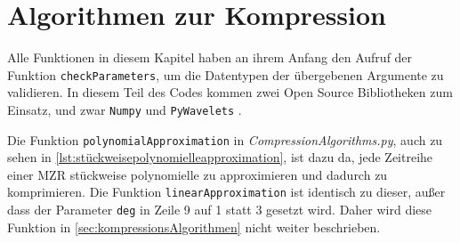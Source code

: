 \section{Algorithmen zur Kompression}\label{sec:kompressionsAlgorithmen}
Alle Funktionen in diesem Kapitel haben an ihrem Anfang den Aufruf der Funktion \lstinline|checkParameters|, um die Datentypen der übergebenen Argumente zu validieren. In diesem Teil des Codes kommen zwei Open Source Bibliotheken zum Einsatz, und zwar \lstinline|Numpy| \cite{cksr2020} und \lstinline|PyWavelets| \cite{grfk2019}.

Die Funktion \lstinline|polynomialApproximation| in \textit{CompressionAlgorithms.py}, auch zu sehen in \autoref{lst:stückweisepolynomielleapproximation}, ist dazu da, jede Zeitreihe einer \ac{MZR} stückweise polynomielle zu approximieren und dadurch zu komprimieren. Die Funktion \lstinline|linearApproximation| ist identisch zu dieser, außer dass der Parameter \lstinline|deg| in Zeile 9 auf 1 statt 3 gesetzt wird. Daher wird diese Funktion in \autoref{sec:kompressionsAlgorithmen} nicht weiter beschrieben.

